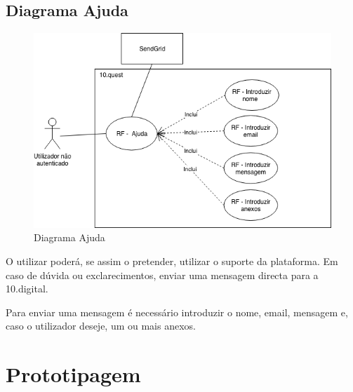 \subsection{Diagrama Ajuda}
\label{d:ajuda}
\begin{figure}[ht!]
	\begin{center}
		\includegraphics[width=1\textwidth]{img/rf/ajuda}
		\caption{Diagrama Ajuda}
		\label{fig:rf-ajuda}
	\end{center}
\end{figure}


O utilizar poderá, se assim o pretender, utilizar o suporte da plataforma. Em caso de dúvida ou exclarecimentos, enviar uma mensagem directa para a 10.digital. 

Para enviar uma mensagem é necessário introduzir o nome, email, mensagem e, caso o utilizador deseje, um ou mais anexos.



\newpage
\section{Prototipagem}
\label{prototipagem}


\blankpage

\glsresetall